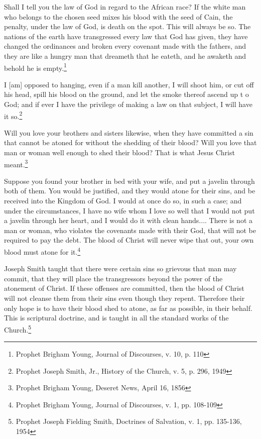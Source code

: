 \begin{displayquote}
Shall I tell you the law of God in regard to the African race? If the white man 
who belongs to the chosen seed mixes his blood with the seed of Cain, the penalty, 
under the law of God, is death on the spot. This will always be so. The nations of 
the earth have transgressed every law that God has given, they have changed the 
ordinances and broken every covenant made with the fathers, and they are like a 
hungry man that dreameth that he eateth, and he awaketh and behold he is
empty.\footnote{Prophet Brigham Young, Journal of Discourses, v. 10, p. 110}
\end{displayquote}

\begin{displayquote}
I [am] opposed to hanging, even if a man kill another, I will shoot him, or cut 
off his head, spill his blood on the ground, and let the smoke thereof ascend up t
o God; and if ever I have the privilege of making a law on that subject, 
I will have it so.\footnote{Prophet Joseph Smith, Jr., History of the Church, v. 
5, p. 296, 1949}
\end{displayquote}

\begin{displayquote}
Will you love your brothers and sisters likewise, when they have committed a sin 
that cannot be atoned for without the shedding of their blood? Will you love that 
man or woman well enough to shed their blood? That is what Jesus Christ
meant.\footnote{Prophet Brigham Young, Deseret News, April 16, 1856}
\end{displayquote}

\begin{displayquote}
Suppose you found your brother in bed with your wife, and put a javelin through 
both of them. You would be justified, and they would atone for their sins, and be 
received into the Kingdom of God. I would at once do so, in such a case; and under 
the circumstances, I have no wife whom I love so well that I would not put a 
javelin through her heart, and I would do it with clean hands.... There is not a 
man or woman, who violates the covenants made with their God, that will not be 
required to pay the debt. The blood of Christ will never wipe that out, your own 
blood must atone for it.\footnote{Prophet Brigham Young, Journal of Discourses, v. 
1, pp. 108-109}
\end{displayquote}

\begin{displayquote}
Joseph Smith taught that there were certain sins so grievous that man may commit, 
that they will place the transgressors beyond the power of the atonement of Christ. 
If these offenses are committed, then the blood of Christ will not cleanse them 
from their sins even though they repent. Therefore their only hope is to have 
their blood shed to atone, as far as possible, in their behalf. This is scriptural 
doctrine, and is taught in all the standard works of the Church.\footnote{
Prophet Joseph Fielding Smith, Doctrines of Salvation, v. 1, pp. 135-136, 1954
}
\end{displayquote}

